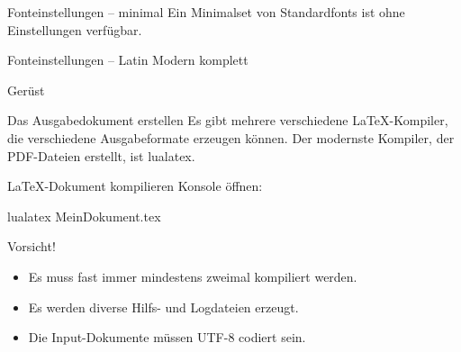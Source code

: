 \begin{frame}{Fonteinstellungen – minimal}
  Ein Minimalset von Standardfonts ist ohne Einstellungen verfügbar.
\end{frame}

\begin{frame}[fragile]{Fonteinstellungen – Latin Modern komplett}
  \begin{lstverbatim}
  \setmainfont[
    SmallCapsFont = {Latin Modern Roman Caps},
    SlantedFont = {Latin Modern Roman Slanted},
    ItalicFeatures  = {
      SmallCapsFont = {LMRomanCaps10-Oblique}
    },
    ]{Latin Modern Roman}

  \setsansfont{Latin Modern Sans}

  \setmonofont[
    SmallCapsFont = {Latin Modern Mono Caps},
    SlantedFont = {Latin Modern Mono Slanted},
    ItalicFeatures  = {
      SmallCapsFont = {LMMonoCaps10-Oblique}
    },
    ]{Latin Modern Mono}
  \end{lstverbatim}
\end{frame}

\begin{frame}[fragile]{Gerüst}
\end{frame}

\begin{frame}[fragile]{Das Ausgabedokument erstellen}
  Es gibt mehrere verschiedene \LaTeX-Kompiler, die verschiedene Ausgabeformate erzeugen können.
  Der modernste Kompiler, der PDF-Dateien erstellt, ist \alert{lualatex}.

  \begin{block}{\LaTeX-Dokument kompilieren}
    Konsole öffnen:
    \begin{lstverbatim}
    lualatex MeinDokument.tex
    \end{lstverbatim}
  \end{block}
  \begin{alertblock}{Vorsicht!}
    \begin{itemize}
      \item Es muss fast immer mindestens zweimal kompiliert werden.
      \item Es werden diverse Hilfs- und Logdateien erzeugt.
      \item Die Input-Dokumente müssen UTF-8 codiert sein.
    \end{itemize}
  \end{alertblock}
\end{frame}
